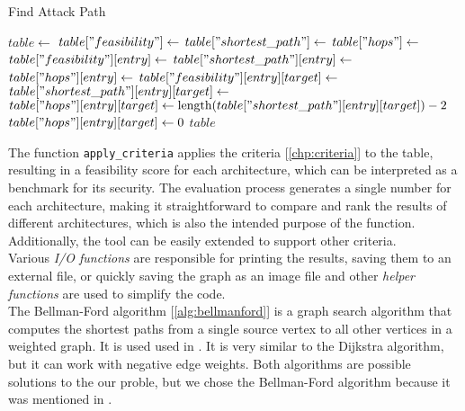 \begin{algorithm}[h]
    \caption{Find Attack Path}
    \label{alg:findattackpath}
    \begin{algorithmic}[1]
        \State $table \gets$ 
        \State $table["feasibility"] \gets$ 
        \State $table["shortest\_path"] \gets$ 
        \State $table["hops"] \gets$ 
            \State $table["feasibility"][entry] \gets$ 
            \State $table["shortest\_path"][entry] \gets$ 
            \State $table["hops"][entry] \gets$ 
                \State $table["feasibility"][entry][target] \gets$ 
                \State $table["shortest\_path"][entry][target] \gets$ 
                    \State $table["hops"][entry][target] \gets \text{length}(table["shortest\_path"][entry][target]) - 2$
                \Else
                    \State $table["hops"][entry][target] \gets 0$
                \EndIf
            \EndFor
        \EndFor
        \State \Return $table$
    \EndProcedure
    \end{algorithmic}
\end{algorithm}
    

The function \texttt{apply\_criteria} applies the criteria [\ref{chp:criteria}] to the table, 
resulting in a feasibility score for each architecture, 
which can be interpreted as a benchmark for its security. 
The evaluation process generates a single number for each architecture, 
making it straightforward to compare and rank the results of different architectures, 
which is also the intended purpose of the function. 
Additionally, the tool can be easily extended to support other criteria.\\

Various \textit{I/O functions} are responsible for printing the results, saving them to an external file, or quickly saving the graph as an image file
and other \textit{helper functions} are used to simplify the code.\\



The Bellman-Ford algorithm [\ref{alg:bellmanford}] is a graph search algorithm that computes 
the shortest paths from a single source vertex to all other vertices in a weighted graph.
It is used used in \texttt{}.
It is very similar to the Dijkstra algorithm, but it can work with negative edge weights.
Both algorithms are possible solutions to the our proble, but we chose the Bellman-Ford algorithm because it was mentioned in \cite{threat_surf}.


